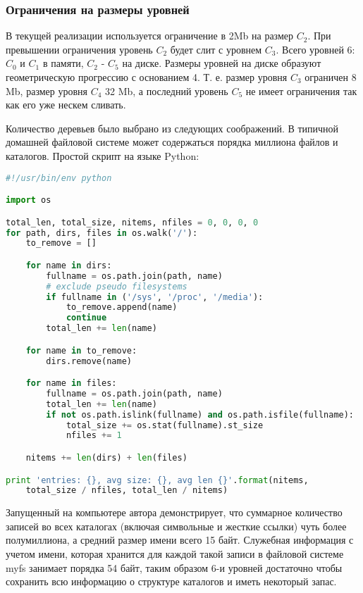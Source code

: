 \subsubsection{Ограничения на размеры уровней}
\label{sec:lsmlev}

В текущей реализации используется ограничение в 2Mb на размер $C_2$. При
превышении ограничения уровень $C_2$ будет слит с уровнем $C_3$. Всего уровней
6: $C_0$ и $C_1$ в памяти, $C_2$ - $C_5$ на диске. Размеры уровней на диске
образуют геометрическую прогрессию с основанием 4. Т. е. размер уровня $C_3$
ограничен 8 Mb, размер уровня $C_4$ 32 Mb, а последний уровень $C_5$ не имеет
ограничения так как его уже нескем сливать.

Количество деревьев было выбрано из следующих соображений. В типичной домашней
файловой системе может содержаться порядка миллиона файлов и каталогов. Простой
скрипт на языке Python:

\begin{lstlisting}[language = Python]
#!/usr/bin/env python

import os

total_len, total_size, nitems, nfiles = 0, 0, 0, 0
for path, dirs, files in os.walk('/'):
    to_remove = []

    for name in dirs:
        fullname = os.path.join(path, name)
        # exclude pseudo filesystems
        if fullname in ('/sys', '/proc', '/media'):
            to_remove.append(name)
            continue
        total_len += len(name)

    for name in to_remove:
        dirs.remove(name)

    for name in files:
        fullname = os.path.join(path, name)
        total_len += len(name)
        if not os.path.islink(fullname) and os.path.isfile(fullname):
            total_size += os.stat(fullname).st_size
            nfiles += 1

    nitems += len(dirs) + len(files)

print 'entries: {}, avg size: {}, avg len {}'.format(nitems,
    total_size / nfiles, total_len / nitems)
\end{lstlisting}
Запущенный на компьютере автора демонстрирует, что суммарное количество записей
во всех каталогах (включая символьные и жесткие ссылки) чуть более полумиллиона,
а средний размер имени всего 15 байт. Служебная информация с учетом имени,
которая хранится для каждой такой записи в файловой системе myfs занимает
порядка 54 байт, таким образом 6-и уровней достаточно чтобы сохранить всю
информацию о структуре каталогов и иметь некоторый запас.


